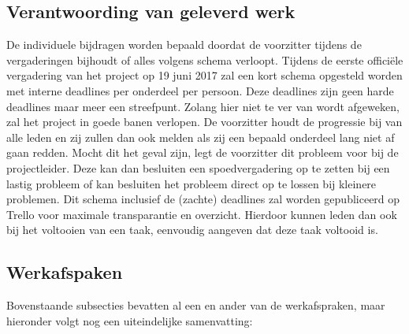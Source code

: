 \documentclass{uva-inf-article}
\begin{document}
\subsection{Verantwoording van geleverd werk}
De individuele bijdragen worden bepaald doordat de voorzitter tijdens de vergaderingen bijhoudt of alles volgens schema verloopt. Tijdens de eerste offici\"ele vergadering van het project op 19 juni 2017 zal een kort schema opgesteld worden met interne deadlines per onderdeel per persoon. Deze deadlines zijn geen harde deadlines maar meer een streefpunt. Zolang hier niet te ver van wordt afgeweken, zal het project in goede banen verlopen. De voorzitter houdt de progressie bij van alle leden en zij zullen dan ook melden als zij een bepaald onderdeel lang niet af gaan redden. Mocht dit het geval zijn, legt de voorzitter dit probleem voor bij de projectleider. Deze kan dan besluiten een spoedvergadering op te zetten bij een lastig probleem of kan besluiten het probleem direct op te lossen bij kleinere problemen.
Dit schema inclusief de (zachte) deadlines zal worden gepubliceerd op Trello
voor maximale transparantie en overzicht. Hierdoor kunnen leden dan ook bij het voltooien van een taak, eenvoudig aangeven dat deze taak voltooid is.

\subsection{Werkafspaken}
Bovenstaande subsecties bevatten al een en ander van de werkafspraken, maar hieronder volgt nog een uiteindelijke samenvatting:
\end{document}
